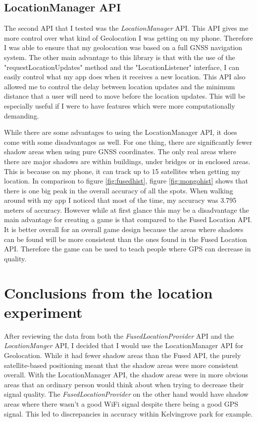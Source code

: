 \documentclass{l4proj}
\begin{document}
\subsection{LocationManager API}
\label{locationManager}
The second API that I tested was the \emph{LocationManager} API. This API gives me more control over what kind of Geolocation I was getting on my phone. Therefore
I was able to ensure that my geolocation was based on a full GNSS navigation system. \citep{locationManager} The other main advantage to this library is that with the use of the "requestLocationUpdates" method and
the "LocationListener" interface, I can easily control what my app does when it receives a new location. This API also allowed me to control the delay between location updates and the minimum
distance that a user will need to move before the location updates. This will be especially useful if I were to have features which were
more computationally demanding.

While there are some advantages to using the LocationManager API, it does come with some disadvantages as well. For one thing, there are significantly fewer shadow areas when using
pure GNSS coordinates. The only real areas where there are major shadows are within buildings, under bridges or in enclosed areas. This is because on my phone, it can track up to 
15 satellites when getting my location. In comparison to figure \ref{fig:fusedhist}, figure \ref{fig:mongohist} shows that there is one big peak in the overall accuracy of all the spots.
When walking around with my app I noticed that most of the time, my accuracy was 3.795 meters of accuracy. However while at first glance this may be a disadvantage the main advantage for creating a
game is that compared to the Fused Location API. It is better overall for an overall game design because the areas where shadows can be found will be more consistent than the ones
found in the Fused Location API. Therefore the game can be used to teach people where GPS can decrease in quality.

\section{Conclusions from the location experiment}
After reviewing the data from both the \emph{FusedLocationProvider} API and the \emph{LocationManger} API,
I decided that I would use the LocationManager API for Geolocation. While it had fewer shadow areas than
the Fused API, the purely satellite-based positioning meant that the shadow areas were more consistent overall.
With the LocationManager API, the shadow areas were in more obvious areas that an ordinary person would think
about when trying to decrease their signal quality. The \emph{FusedLocationProvider} on the other hand
would have shadow areas where there wasn't a good WiFi signal despite there being a good GPS signal.
This led to discrepancies in accuracy within Kelvingrove park for example.
\end{document}
